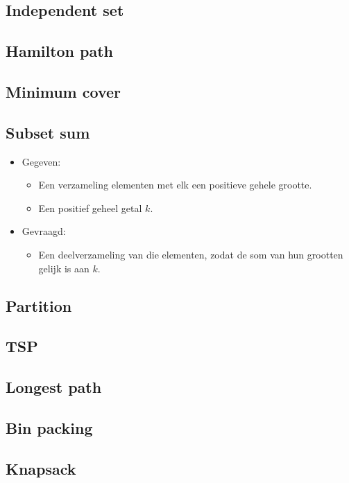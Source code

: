 \subsection{Independent set}

\subsection{Hamilton path}

\subsection{Minimum cover}

\subsection{Subset sum}
\begin{itemize}
    \item Gegeven:
    \begin{itemize}
        \item Een verzameling elementen met elk een positieve gehele grootte.
        \item Een positief geheel getal $k$.
    \end{itemize}
    \item Gevraagd:
    \begin{itemize}
        \item Een deelverzameling van die elementen, zodat de som van hun grootten gelijk is aan $k$.
    \end{itemize}
\end{itemize}

\subsection{Partition}

\subsection{TSP}

\subsection{Longest path}

\subsection{Bin packing}

\subsection{Knapsack}
